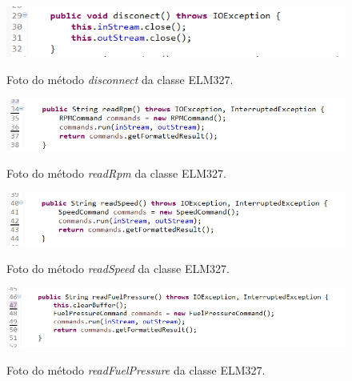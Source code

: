 \begin{figure}[!ht]
\centering
\caption{Foto do método \textit{disconnect} da classe ELM327.} 
{\includegraphics[scale=.70]{imagens/pacoteScanner-ELM327_disconnect.PNG}}\\
 \label{Fig:elm327_disconnect}
\end{figure}

\begin{figure}[!ht]
\centering
\caption{Foto do método \textit{readRpm} da classe ELM327.} 
{\includegraphics[scale=.85]{imagens/pacoteScanner-ELM327_readRpm.PNG}}\\
 \label{Fig:elm327_read_rpm}
\end{figure}

\begin{figure}[!ht]
\centering
\caption{Foto do método \textit{readSpeed} da classe ELM327.} 
{\includegraphics[scale=.85]{imagens/pacoteScanner-ELM327_readSpeed.PNG}}\\
 \label{Fig:elm327_read_speed}
\end{figure}

\begin{figure}[!ht]
\centering
\caption{Foto do método \textit{readFuelPressure} da classe ELM327.} 
{\includegraphics[scale=.80]{imagens/pacoteScanner-ELM327_readFuelPressure.PNG}}\\
 \label{Fig:elm327_read_fuel_pressure}
\end{figure}

